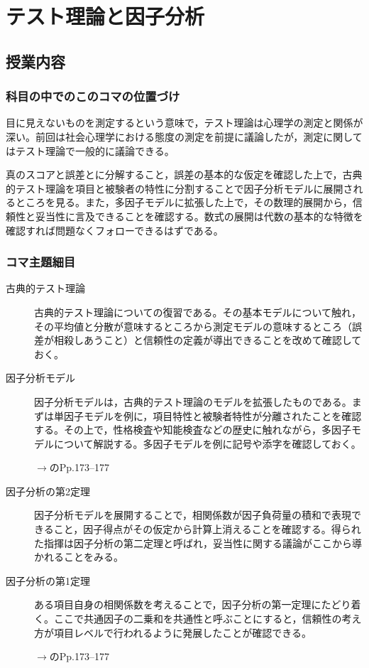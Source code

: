 \section{テスト理論と因子分析}
\subsection{授業内容}
\subsubsection{科目の中でのこのコマの位置づけ}
目に見えないものを測定するという意味で，テスト理論は心理学の測定と関係が深い。前回は社会心理学における態度の測定を前提に議論したが，測定に関してはテスト理論で一般的に議論できる。

真のスコアと誤差とに分解すること，誤差の基本的な仮定を確認した上で，古典的テスト理論を項目と被験者の特性に分割することで因子分析モデルに展開されるところを見る。また，多因子モデルに拡張した上で，その数理的展開から，信頼性と妥当性に言及できることを確認する。数式の展開は代数の基本的な特徴を確認すれば問題なくフォローできるはずである。

\subsubsection{コマ主題細目}
\begin{description}
	\item[古典的テスト理論]古典的テスト理論についての復習である。その基本モデルについて触れ，その平均値と分散が意味するところから測定モデルの意味するところ（誤差が相殺しあうこと）と信頼性の定義が導出できることを改めて確認しておく。

	\item[因子分析モデル]因子分析モデルは，古典的テスト理論のモデルを拡張したものである。まずは単因子モデルを例に，項目特性と被験者特性が分離されたことを確認する。その上で，性格検査や知能検査などの歴史に触れながら，多因子モデルについて解説する。多因子モデルを例に記号や添字を確認しておく。
	      \begin{flushright}
		      $\to$\textcite{kosugi2018}のPp.173--177
	      \end{flushright}

	\item[因子分析の第2定理]因子分析モデルを展開することで，相関係数が因子負荷量の積和で表現できること，因子得点がその仮定から計算上消えることを確認する。得られた指揮は因子分析の第二定理と呼ばれ，妥当性に関する議論がここから導かれることをみる。

	\item[因子分析の第1定理]ある項目自身の相関係数を考えることで，因子分析の第一定理にたどり着く。ここで共通因子の二乗和を共通性と呼ぶことにすると，信頼性の考え方が項目レベルで行われるように発展したことが確認できる。
	      \begin{flushright}
		      $\to$\textcite{kosugi2018}のPp.173--177
	      \end{flushright}
\end{description}
